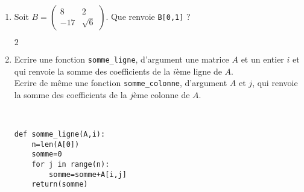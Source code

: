\begin{enumerate}
\item Soit $B=\begin{pmatrix}
8&2\\-17&\sqrt{6}
\end{pmatrix}$. Que renvoie \verb?B[0,1]? ?
\begin{solution}
$2$
\end{solution}
\item Ecrire une fonction \verb?somme_ligne?, d'argument une matrice $A$ et un entier $i$ et qui renvoie la somme des coefficients de la $i$ème ligne de $A$.\\
Ecrire de même une fonction \verb?somme_colonne?, d'argument $A$ et $j$, qui renvoie la somme des coefficients de la $j$ème colonne de $A$.
\begin{solution}~\\
\vspace*{-0.7cm}
\begin{verbatim}
def somme_ligne(A,i):
    n=len(A[0])
    somme=0
    for j in range(n):
        somme=somme+A[i,j]
    return(somme)


\end{verbatim}
\end{solution}
\end{enumerate}
